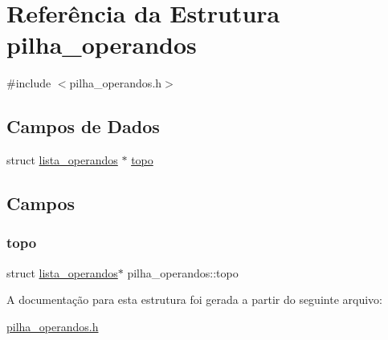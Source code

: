 \hypertarget{structpilha__operandos}{}\section{Referência da Estrutura pilha\+\_\+operandos}
\label{structpilha__operandos}


{\ttfamily \#include $<$pilha\+\_\+operandos.\+h$>$}

\subsection*{Campos de Dados}
\begin{DoxyCompactItemize}
\item 
struct \hyperlink{structlista__operandos}{lista\+\_\+operandos} $\ast$ \hyperlink{structpilha__operandos_a993dd7722eed1663f266c36ecf0b8417}{topo}
\end{DoxyCompactItemize}


\subsection{Campos}
\mbox{\label{structpilha__operandos_a993dd7722eed1663f266c36ecf0b8417}} 
\subsubsection{\texorpdfstring{topo}{topo}}
{\footnotesize\ttfamily struct \hyperlink{structlista__operandos}{lista\+\_\+operandos}$\ast$ pilha\+\_\+operandos\+::topo}



A documentação para esta estrutura foi gerada a partir do seguinte arquivo\+:\begin{DoxyCompactItemize}
\item 
\hyperlink{pilha__operandos_8h}{pilha\+\_\+operandos.\+h}\end{DoxyCompactItemize}
